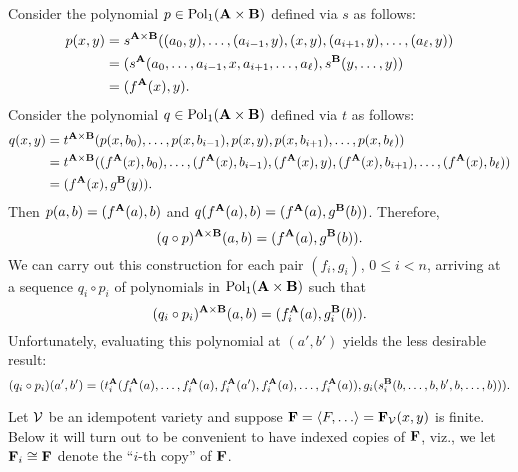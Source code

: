 \bigskip
Consider the polynomial $p \in \operatorname{Pol}_1(\mathbf{A}\times \mathbf{B})$ defined via
$s$ as follows:
\begin{align*}
p(x,y) &= s^{\mathbf{A} \times \mathbf{B}}((a_0, y), \dots, (a_{i-1}, y), (x, y), (a_{i+1}, y), \dots, (a_{\ell}, y))\\
&= (s^{\mathbf{A}} (a_0, \dots, a_{i-1}, x, a_{i+1}, \dots, a_{\ell}), 
s^{\mathbf{B}}(y, \dots, y))\\
&= (f^{\mathbf{A}} (x), y).
\end{align*}
Consider the polynomial $q \in \operatorname{Pol}_1(\mathbf{A}\times \mathbf{B})$ defined via
$t$ as follows:
\begin{align*}
  q(x,y) &= t^{\mathbf{A} \times \mathbf{B}}(p(x,b_0),
  \dots, p(x, b_{i-1}),p(x,y),
  p(x, b_{i+1}), \dots, p(x, b_{\ell}))\\
  &= t^{\mathbf{A} \times \mathbf{B}}((f^{\mathbf{A}}(x), b_0), \dots, (f^{\mathbf{A}}(x), b_{i-1}),(f^{\mathbf{A}}(x),y),
(f^{\mathbf{A}}(x), b_{i+1}), \dots, (f^{\mathbf{A}}(x), b_{\ell}))\\
&= (f^{\mathbf{A}}(x), g^{\mathbf{B}}(y)).
\end{align*}
Then $p(a,b) = (f^{\mathbf{A}}(a), b)$ and $q(f^{\mathbf{A}}(a), b) = (f^{\mathbf{A}}(a),g^{\mathbf{B}}(b))$.
Therefore,
\[
(q\circ p)^{\mathbf{A}\times \mathbf{B}} (a,b) =
(f^{\mathbf{A}} (a), g^{\mathbf{B}} (b)).
\]
We can carry out this construction for each pair $(f_i, g_i)$, $0\leq i < n$,
arriving at a sequence $q_i \circ p_i$ of polynomials in
$\operatorname{Pol}_1(\mathbf{A} \times \mathbf{B})$ such that
\[
(q_i\circ p_i)^{\mathbf{A}\times \mathbf{B}} (a,b) =
(f_i^{\mathbf{A}} (a), g_i^{\mathbf{B}} (b)).
\]
Unfortunately, evaluating this polynomial at $(a',b')$ yields the less
desirable result:
\[
(q_i\circ p_i)(a',b')=
(t_i^{\mathbf{A}}(f_i^{\mathbf{A}} (a), \dots, f_i^{\mathbf{A}} (a), f_i^{\mathbf{A}} (a'),f_i^{\mathbf{A}} (a), \dots, f_i^{\mathbf{A}} (a)),
g_i(s_i^{\mathbf{B}}(b, \dots, b, b', b,\dots, b))).
\]




\newpage

  Let $\mathcal{V}$ be an idempotent variety and suppose $\bF = \<F, \dots\> = \bF_{\sV}(x,y)$ is finite.
  Below it will turn out to be convenient to have indexed copies of $\mathbf{F}$, viz.,
  we let $\mathbf{F}_i \cong \mathbf{F}$ denote the ``$i$-th copy'' of $\mathbf{F}$. 


